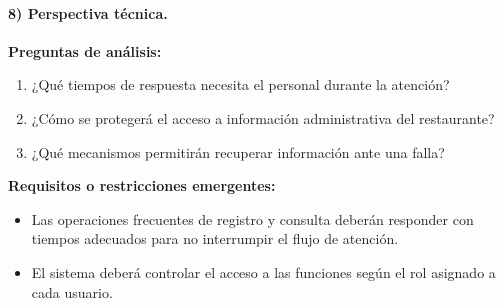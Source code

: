 \paragraph{8) Perspectiva técnica.}

\textbf{Preguntas de análisis:}
\begin{enumerate}
    \item ¿Qué tiempos de respuesta necesita el personal durante la atención?
    \item ¿Cómo se protegerá el acceso a información administrativa del restaurante?
    \item ¿Qué mecanismos permitirán recuperar información ante una falla?
\end{enumerate}

\textbf{Requisitos o restricciones emergentes:}
\begin{itemize}
    \item Las operaciones frecuentes de registro y consulta deberán responder
    con tiempos adecuados para no interrumpir el flujo de atención.
    \item El sistema deberá controlar el acceso a las funciones según el rol
    asignado a cada usuario.
\end{itemize}
